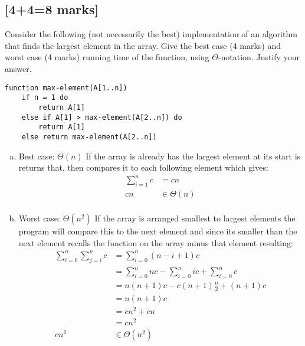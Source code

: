 \documentclass[12pt]{article}
\begin{document}
\subsection{[4+4=8 marks]}
Consider the following (not necessarily the best) implementation of an algorithm that finds the largest element in the array. Give the best case (4 marks)
and worst case (4 marks) running time of the function, using $\Theta$-notation. Justify your answer.
\begin{verbatim}
function max-element(A[1..n])
    if n = 1 do
        return A[1]
    else if A[1] > max-element(A[2..n]) do
        return A[1]
    else return max-element(A[2..n])
\end{verbatim}
\begin{enumerate}[(a)]
\item Best case: $\Theta(n)$
If the array is already has the largest element at its start is returns that, then compares it to each following element which gives:\\
\begin{align*}
\displaystyle\sum_{i=1}^n c&=cn\\
cn &\in \Theta(n)\\ 
\end{align*}
\item Worst case: $\Theta(n^2)$
If the array is arranged smallest to largest elements the program will compare this to the next element and since its smaller than the next element recalls the function on the array minus that element resulting:\\
\begin{align*}
\displaystyle\sum_{i=0}^n\sum_{j=i}^n c&= \displaystyle\sum_{i=0}^n (n-i+1)c\\
&= \displaystyle\sum_{i=0}^n nc - \displaystyle\sum_{i=0}^n ic + \displaystyle\sum_{i=0}^n c\\
&= n(n+1)c - c(n+1)\frac{n}{2} + (n+1)c\\
&= n(n+1)c\\
&=cn^2 + cn\\
&= cn^2\\
cn^2 &\in \Theta(n^2)
\end{align*}
\end{enumerate}
\end{document}
